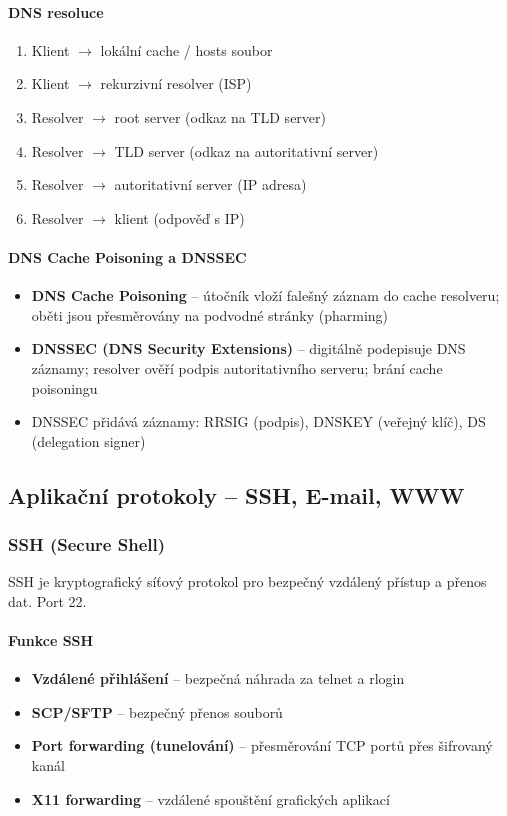 \paragraph{DNS resoluce}
\begin{enumerate}
  \item Klient $\to$ lokální cache / hosts soubor
  \item Klient $\to$ rekurzivní resolver (ISP)
  \item Resolver $\to$ root server (odkaz na TLD server)
  \item Resolver $\to$ TLD server (odkaz na autoritativní server)
  \item Resolver $\to$ autoritativní server (IP adresa)
  \item Resolver $\to$ klient (odpověď s IP)
\end{enumerate}

\paragraph{DNS Cache Poisoning a DNSSEC}
\begin{itemize}
  \item \textbf{DNS Cache Poisoning} -- útočník vloží falešný záznam do cache resolveru; oběti
    jsou přesměrovány na podvodné stránky (pharming)
  \item \textbf{DNSSEC (DNS Security Extensions)} -- digitálně podepisuje DNS záznamy;
    resolver ověří podpis autoritativního serveru; brání cache poisoningu
  \item DNSSEC přidává záznamy: RRSIG (podpis), DNSKEY (veřejný klíč), DS (delegation signer)
\end{itemize}

\subsection{Aplikační protokoly -- SSH, E-mail, WWW}

\subsubsection{SSH (Secure Shell)}

SSH je kryptografický síťový protokol pro bezpečný vzdálený přístup a přenos dat. Port 22.

\paragraph{Funkce SSH}
\begin{itemize}
  \item \textbf{Vzdálené přihlášení} -- bezpečná náhrada za telnet a rlogin
  \item \textbf{SCP/SFTP} -- bezpečný přenos souborů
  \item \textbf{Port forwarding (tunelování)} -- přesměrování TCP portů přes šifrovaný kanál
  \item \textbf{X11 forwarding} -- vzdálené spouštění grafických aplikací
\end{itemize}

